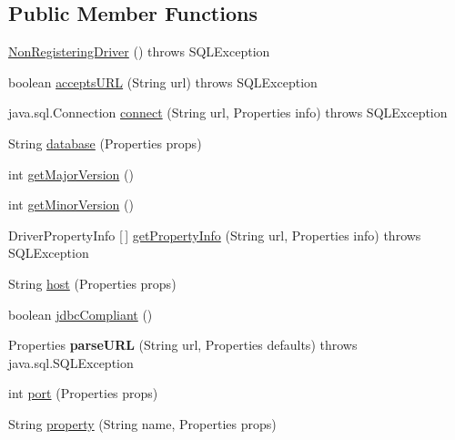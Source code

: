 \subsection*{Public Member Functions}
\begin{DoxyCompactItemize}
\item 
\mbox{\hyperlink{classcom_1_1mysql_1_1jdbc_1_1_non_registering_driver_ad16f3c604c147f06e5c90e626e9975bd}{Non\+Registering\+Driver}} ()  throws S\+Q\+L\+Exception 
\item 
boolean \mbox{\hyperlink{classcom_1_1mysql_1_1jdbc_1_1_non_registering_driver_abe7a0b5bf395ae24c4346d6bab87a0be}{accepts\+U\+RL}} (String url)  throws S\+Q\+L\+Exception 
\item 
java.\+sql.\+Connection \mbox{\hyperlink{classcom_1_1mysql_1_1jdbc_1_1_non_registering_driver_a834c012e752a01d1ee435b3461bb8218}{connect}} (String url, Properties info)  throws S\+Q\+L\+Exception 
\item 
String \mbox{\hyperlink{classcom_1_1mysql_1_1jdbc_1_1_non_registering_driver_a909c0d681654054551d09e9c842f5727}{database}} (Properties props)
\item 
int \mbox{\hyperlink{classcom_1_1mysql_1_1jdbc_1_1_non_registering_driver_ab6b8f50a93d9ed238b561b75f33aac56}{get\+Major\+Version}} ()
\item 
int \mbox{\hyperlink{classcom_1_1mysql_1_1jdbc_1_1_non_registering_driver_a481b3ce93c080001bea84164b93489bf}{get\+Minor\+Version}} ()
\item 
Driver\+Property\+Info \mbox{[}$\,$\mbox{]} \mbox{\hyperlink{classcom_1_1mysql_1_1jdbc_1_1_non_registering_driver_a726bb5014e1cdfffa313257781d4496d}{get\+Property\+Info}} (String url, Properties info)  throws S\+Q\+L\+Exception 
\item 
String \mbox{\hyperlink{classcom_1_1mysql_1_1jdbc_1_1_non_registering_driver_a3b94f70cb8b81fa3c6691fde8a63b776}{host}} (Properties props)
\item 
boolean \mbox{\hyperlink{classcom_1_1mysql_1_1jdbc_1_1_non_registering_driver_ac4218acdf4a11d1fce9c18779564e2fb}{jdbc\+Compliant}} ()
\item 
\mbox{\label{classcom_1_1mysql_1_1jdbc_1_1_non_registering_driver_ab52e8de0c448c5e947cf50bc066a6820}} 
Properties {\bfseries parse\+U\+RL} (String url, Properties defaults)  throws java.\+sql.\+S\+Q\+L\+Exception 
\item 
int \mbox{\hyperlink{classcom_1_1mysql_1_1jdbc_1_1_non_registering_driver_a90edfd44b2f276ac386d4ab31c76ace6}{port}} (Properties props)
\item 
String \mbox{\hyperlink{classcom_1_1mysql_1_1jdbc_1_1_non_registering_driver_a62d32f3556978d8c7a9f2702b44c8c82}{property}} (String name, Properties props)
\end{DoxyCompactItemize}
